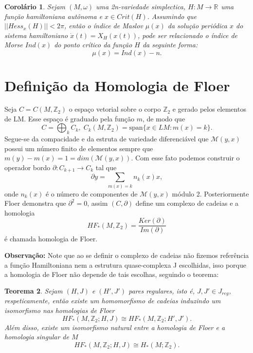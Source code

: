 \documentclass[12pt]{book}
\newtheorem{teorema}{Teorema}[section]
\newtheorem{corolario}[teorema]{Corolário}
\newcommand{\real}[1]{\mathbb{R}^{#1}}
\begin{document}
	\begin{corolario}
		Sejam $(M, \omega)$ uma 2n-variedade simplectica, $H : M \to \real{}$ uma função hamiltoniana autônoma e $x \in Crit(H)$. Assumindo que $||Hess_{x}(H)|| < 2\pi$, então o índice de Maslov $\mu(x)$ da solução periódica $x$ do sistema hamiltoniano $\dot{x}(t) = X_{H}(x(t))$, pode ser relacionado o índice de Morse $Ind(x)$ do ponto crítico da função $H$ da seguinte forma:
		$$
		\mu(x) = Ind(x) - n.
		$$
	\end{corolario}	
	
	\section{Definição da Homologia de Floer}
	Seja $C = C(M, \mathbb{Z}_{2})$ o espaço vetorial sobre o corpo $\mathbb{Z}_{2}$ e gerado pelos elementos de LM. Esse espaço é graduado pela função $m$, de modo que
	$$
	C = \bigoplus_{k}C_{k}, \; C_{k}(M, \mathbb{Z}_{2}) = \text{span}\{x \in LM:m(x)=k \}.
	$$
	Segue-se da compacidade e da estruta de variedade diferenciável que $\mathcal{M}(y,x)$ possui um número finito de elementos sempre que $ m(y)-m(x)=1 = dim(\mathcal{M}(y,x))$. Com esse fato podemos construir o operador bordo $\partial : C_{k+1} \to C_{k}$ tal que
	$$
	\partial y = \sum_{m(x)=k} n_{k}(x) x,	
	$$
	onde $n_{k}(x)$ é o número de componentes de $\mathcal{M}(y,x)$ módulo 2. Posteriormente Floer demonstra que $\partial^{2}=0$, assim $(C,\partial)$ define um complexo de cadeias e a homologia
	$$
	HF_{*}(M, \mathbb{Z}_{2}) = \frac{Ker(\partial)}{Im(\partial)}
	$$
	é chamada homologia de Floer.
	
	\textbf{Observação:} Note que ao se definir o complexo de cadeias não fizemos referência a função Hamiltoniana nem a estrutura quase-complexa J escolhidas, isso porque a homologia de Floer não depende de tais escolhas, seguindo o teorema:
	
	\begin{teorema}
		Sejam $(H,J)$ e $(H',J')$ pares regulares, isto é, $J, J' \in J_{reg}$, respeticamente, então existe um homomorfismo de cadeias induzindo um isomorfismo nas homologias de Floer
		$$
		HF_{*}(M,\mathbb{Z}_{2};H,J) \cong HF_{*}(M,\mathbb{Z}_{2};H',J'). 
		$$
		Além disso, existe um isomorfismo natural entre a homologia de Floer e a homologia singular de $M$
		$$
		HF_{*}(M,\mathbb{Z}_{2};H,J) \cong H_{*}(M;\mathbb{Z}_{2}). 
		$$
	\end{teorema}
	
\end{document}

